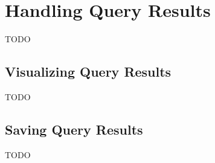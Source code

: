 \chapter{Handling Query Results}
\label{chap:handling_query_results}

TODO

\section{Visualizing Query Results}
\label{sec:visualizing_query_results}

TODO

\section{Saving Query Results}
\label{sec:saving_query_results}

TODO